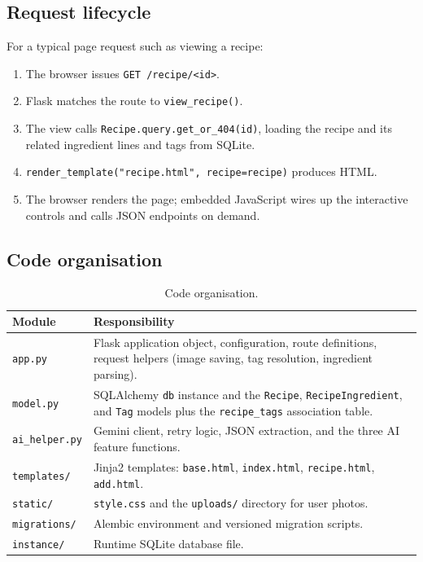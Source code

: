 \documentclass[11pt,a4paper]{article}
\newcommand{\code}[1]{\texttt{#1}}
\begin{document}
\subsection{Request lifecycle}
For a typical page request such as viewing a recipe:
\begin{enumerate}[nosep]
  \item The browser issues \code{GET /recipe/<id>}.
  \item Flask matches the route to \code{view\_recipe()}.
  \item The view calls \code{Recipe.query.get\_or\_404(id)}, loading the recipe
        and its related ingredient lines and tags from SQLite.
  \item \code{render\_template("recipe.html", recipe=recipe)} produces HTML.
  \item The browser renders the page; embedded JavaScript wires up the
        interactive controls and calls JSON endpoints on demand.
\end{enumerate}

\subsection{Code organisation}
\begin{table}[h]
\centering
\small
\begin{tabularx}{\textwidth}{@{}lX@{}}
\toprule
\textbf{Module} & \textbf{Responsibility} \\
\midrule
\code{app.py}        & Flask application object, configuration, route definitions, request helpers (image saving, tag resolution, ingredient parsing). \\
\code{model.py}      & SQLAlchemy \code{db} instance and the \code{Recipe}, \code{RecipeIngredient}, and \code{Tag} models plus the \code{recipe\_tags} association table. \\
\code{ai\_helper.py} & Gemini client, retry logic, JSON extraction, and the three AI feature functions. \\
\code{templates/}    & Jinja2 templates: \code{base.html}, \code{index.html}, \code{recipe.html}, \code{add.html}. \\
\code{static/}       & \code{style.css} and the \code{uploads/} directory for user photos. \\
\code{migrations/}   & Alembic environment and versioned migration scripts. \\
\code{instance/}     & Runtime SQLite database file. \\
\bottomrule
\end{tabularx}
\caption{Code organisation.}
\end{table}
\end{document}
